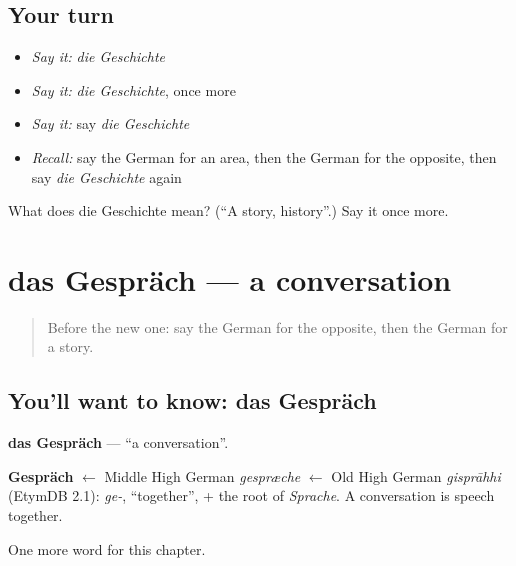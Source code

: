 \subsection*{Your turn}
\begin{itemize}
\raggedright
  \item \emph{Say it:} \emph{die Geschichte}
  \item \emph{Say it:} \emph{die Geschichte}, once more
  \item \emph{Say it:} say \emph{die Geschichte}
  \item \emph{Recall:} say the German for an area, then the German for the opposite, then say \emph{die Geschichte} again
\end{itemize}

\begin{tcolorbox}[breakable,colback=teal!4,colframe=teal!35!black,title={Before you move on}]
What does die Geschichte mean? (\textquotedblleft{}A story, history\textquotedblright{}.) Say it once more.
\end{tcolorbox}
\section[das Gespräch]{das Gespräch — a conversation}

\label{lesson:GE-C230-gespraech}



\begin{quote}
Before the new one: say the German for the opposite, then the German for a story.
\end{quote}

\subsection*{You'll want to know: das Gespräch}
\textbf{das Gespräch} — \textquotedblleft{}a conversation\textquotedblright{}.

\begin{cousinweb}
\textbf{Gespräch} $\leftarrow$ Middle High German \emph{gespræche} $\leftarrow$ Old High German \emph{gisprāhhi} (EtymDB 2.1): \emph{ge-}, \textquotedblleft{}together\textquotedblright{}, + the root of \emph{Sprache}. A conversation is speech together.
\end{cousinweb}

\begin{grammarlens}[title={What you've built}]
One more word for this chapter.
\end{grammarlens}

